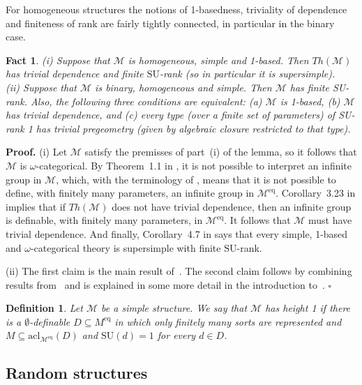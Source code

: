 \documentclass[11pt, twoside]{amsart}
\newtheorem{defin}[theor]{Definition}
\newtheorem{fact}[theor]{Fact}
\numberwithin{equation}{section}
\newcommand{\acl}{\mathrm{acl}}
\newcommand{\es}{\emptyset}
\newcommand{\su}{\mathrm{SU}}
\newcommand{\meq}{^{\mathrm{eq}}}
\newcommand{\mcM}{\mathcal{M}}
\begin{document}
\noindent
For homogeneous structures the notions of 1-basedness, triviality of dependence and finiteness of rank 
are fairly tightly connected, in particular in the binary case.

\begin{fact}\label{homogeneity and 1-basedness implies finite rank and trivial dependence}
(i) Suppose that $\mcM$ is homogeneous, simple and 1-based.
Then $Th(\mcM)$ has trivial dependence and finite $\su$-rank (so in particular it is supersimple).\\
(ii) Suppose that $\mcM$ is binary, homogeneous and simple.
Then $\mcM$ has finite SU-rank. Also, the following three conditions are equivalent:
(a) $\mcM$ is 1-based, (b) $\mcM$ has trivial dependence, and 
(c) every type (over a finite set of parameters) of SU-rank 1 has trivial pregeometry (given by algebraic closure restricted
to that type).
\end{fact}

\noindent
{\bf Proof.}
(i) Let $\mcM$ satisfy the premisses of part~(i) of the lemma, so it follows that $\mcM$ is $\omega$-categorical.
By Theorem~1.1 in \cite{Mac91}, it is not possible to interpret an infinite group in $\mcM$, which, with the
terminology of \cite{Mac91}, means that it is not possible to define, with finitely many parameters, an infinite group in $\mcM\meq$.
Corollary~3.23 in \cite{PK} implies that if $Th(\mcM)$ does not have trivial dependence,
then an infinite group is definable, with finitely many parameters, in $\mcM\meq$.
It follows that $\mcM$ must have trivial dependence.
And finally, Corollary~4.7 in \cite{HKP} says that every simple, 1-based and $\omega$-categorical theory is supersimple with 
finite $\su$-rank.

(ii) The first claim is the main result of~\cite{Kop15}.
The second claim follows by combining results from~\cite{PK, HKP, Mac91} and is explained in some more detail
in the introduction to~\cite{Kop15}.
\hfill $\square$

\begin{defin}\label{definition of height}{\rm
Let $\mcM$ be a simple structure.
We say that $\mcM$ has {\em height 1} if there is a $\es$-definable $D \subseteq M\meq$ in which only finitely 
many sorts are represented and  $M \subseteq \acl_{\mcM\meq}(D)$ and $\su(d) = 1$ for every $d \in D$.
}\end{defin}






\subsection{Random structures}\label{Random structures}
\end{document}
